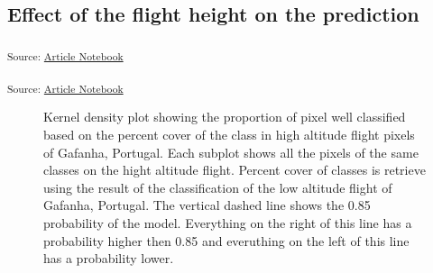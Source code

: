 \documentclass[
  number]{elsarticle}
\begin{document}
\subsection{Effect of the flight height on the
prediction}\label{effect-of-the-flight-height-on-the-prediction}

\textsubscript{Source:
\href{https://SigOiry.github.io/Drone_Paper_2023/index.qmd.html}{Article
Notebook}}

\textsubscript{Source:
\href{https://SigOiry.github.io/Drone_Paper_2023/index.qmd.html}{Article
Notebook}}

\label{cell-fig-upscaling}
\begin{figure}[H]


\caption{\label{fig-upscaling}Kernel density plot showing the proportion
of pixel well classified based on the percent cover of the class in high
altitude flight pixels of Gafanha, Portugal. Each subplot shows all the
pixels of the same classes on the hight altitude flight. Percent cover
of classes is retrieve using the result of the classification of the low
altitude flight of Gafanha, Portugal. The vertical dashed line shows the
0.85 probability of the model. Everything on the right of this line has
a probability higher then 0.85 and everuthing on the left of this line
has a probability lower.}

\end{figure}%
\end{document}
